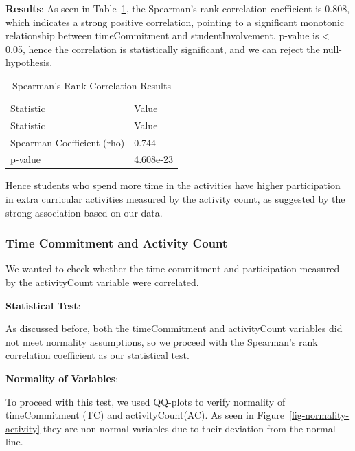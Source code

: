 \documentclass[
  letterpaper,
  DIV=11,
  numbers=noendperiod]{scrartcl}
\begin{document}
\textbf{Results}: As seen in Table~\ref{tbl-spear-corr}, the Spearman's
rank correlation coefficient is 0.808, which indicates a strong positive
correlation, pointing to a significant monotonic relationship between
timeCommitment and studentInvolvement. p-value is \textless{} 0.05,
hence the correlation is statistically significant, and we can reject
the null-hypothesis.

\begin{longtable}[]{@{}ll@{}}

\caption{\label{tbl-spear-corr}Correlation Test Results}

\tabularnewline

\caption{Spearman's Rank Correlation Results}\tabularnewline
\toprule\noalign{}
Statistic & Value \\
\midrule\noalign{}
\endfirsthead
\toprule\noalign{}
Statistic & Value \\
\midrule\noalign{}
\endhead
\bottomrule\noalign{}
\endlastfoot
Spearman Coefficient (rho) & 0.744 \\
p-value & 4.608e-23 \\

\end{longtable}

Hence students who spend more time in the activities have higher
participation in extra curricular activities measured by the activity
count, as suggested by the strong association based on our data.

\subsubsection{Time Commitment and Activity
Count}\label{time-commitment-and-activity-count}

We wanted to check whether the time commitment and participation
measured by the activityCount variable were correlated.

\textbf{Statistical Test}:

As discussed before, both the timeCommitment and activityCount variables
did not meet normality assumptions, so we proceed with the Spearman's
rank correlation coefficient as our statistical test.

\textbf{Normality of Variables}:

To proceed with this test, we used QQ-plots to verify normality of
timeCommitment (TC) and activityCount(AC). As seen in
Figure~\ref{fig-normality-activity} they are non-normal variables due to
their deviation from the normal line.
\end{document}
